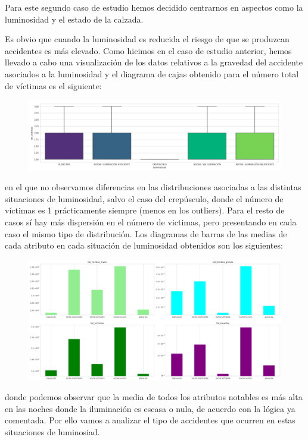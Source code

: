 \documentclass[a4paper,11pt]{book}
\begin{document}
Para este segundo caso de estudio hemos decidido centrarnos en aspectos como la luminosidad y el estado de la calzada. 

Es obvio que cuando la luminosidad es reducida el riesgo de que se produzcan accidentes es más elevado. Como hicimos en el caso de estudio anterior, hemos llevado  a cabo una visualización de los datos relativos a la gravedad del accidente asociados a la luminosidad y el diagrama de cajas obtenido para el número total de víctimas es el siguiente:

\begin{figure}[H]
	\centering
	\includegraphics[width=1.1\linewidth]{img/cajas_luminosidad}
	\caption{}
	\label{fig:cajasluminosidad}
\end{figure}

en el que no observamos diferencias en las distribuciones asociadas a las distintas situaciones de luminosidad, salvo el caso del crepúsculo, donde el número de víctimas es 1 prácticamente siempre (menos en los outliers). Para el resto de casos sí hay más dispersión en el número de victimas, pero presentando en cada caso el mismo tipo de distribución.
Los diagramas de barras de las medias de cada atributo en cada situación de luminosidad obtenidos son los siguientes:
\begin{figure}[H]
	\centering
	\includegraphics[width=1\linewidth]{img/influencia_luminosidad}
	\caption{}
	\label{fig:influencialuminosidad}
\end{figure}

donde podemos observar que la media de todos los atributos notables es más alta en las noches donde la iluminación es escasa o nula, de acuerdo con la lógica ya comentada. Por ello vamos a analizar el tipo de accidentes que ocurren en estas situaciones de luminosiad.
\end{document}
